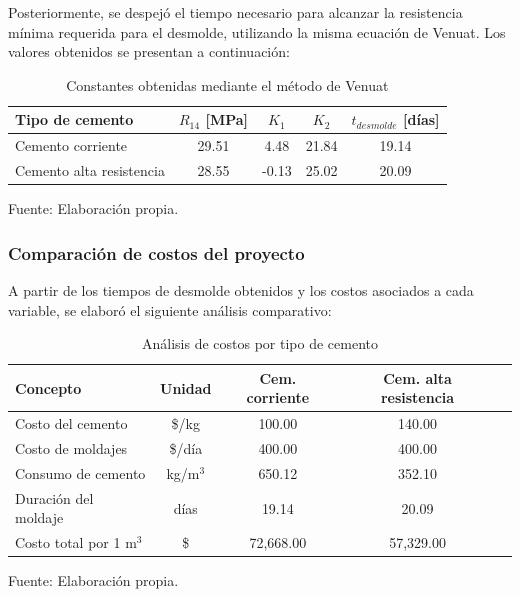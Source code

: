 Posteriormente, se despejó el tiempo necesario para alcanzar la resistencia mínima requerida para el desmolde, utilizando la misma ecuación de Venuat.  
Los valores obtenidos se presentan a continuación:

\begin{table}[H]
\centering
\renewcommand{\arraystretch}{1.15}
\caption{Constantes obtenidas mediante el método de Venuat}
\small
\begin{tabular}{lcccc}
\hline
\textbf{Tipo de cemento} & \textbf{$R_{14}$ [MPa]} & \textbf{$K_1$} & \textbf{$K_2$} & \textbf{$t_{desmolde}$ [días]} \\ \hline
Cemento corriente & 29.51 & 4.48 & 21.84 & 19.14 \\
Cemento alta resistencia & 28.55 & -0.13 & 25.02 & 20.09 \\ \hline
\end{tabular}
\begin{center}
Fuente: Elaboración propia.
\end{center}
\end{table}

\subsubsection*{Comparación de costos del proyecto}

A partir de los tiempos de desmolde obtenidos y los costos asociados a cada variable, se elaboró el siguiente análisis comparativo:

\begin{table}[H]
\centering
\renewcommand{\arraystretch}{1.10}
\caption{Análisis de costos por tipo de cemento}
\small
\begin{tabular}{lcccc}
\hline
\textbf{Concepto} & \textbf{Unidad} & \textbf{Cem. corriente} & \textbf{Cem. alta resistencia} \\ \hline
Costo del cemento & \$/kg & 100.00 & 140.00 \\
Costo de moldajes & \$/día & 400.00 & 400.00 \\
Consumo de cemento & kg/m$^3$ & 650.12 & 352.10 \\
Duración del moldaje & días & 19.14 & 20.09 \\
Costo total por 1 m$^3$ & \$ & 72,668.00 & 57,329.00 \\ \hline
\end{tabular}
\begin{center}
Fuente: Elaboración propia.
\end{center}
\end{table}

